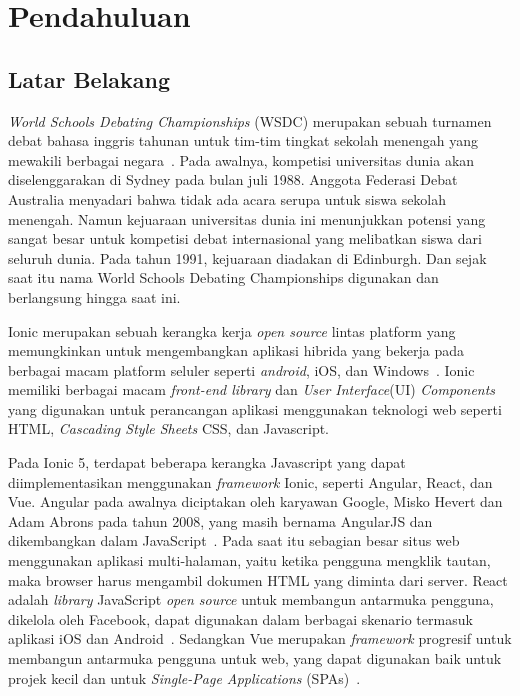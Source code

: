 \chapter{Pendahuluan}
\label{chap:intro}
   
\section{Latar Belakang}
\label{sec:label}

\textit{World Schools Debating Championships} (WSDC) merupakan sebuah turnamen debat bahasa inggris tahunan untuk tim-tim tingkat sekolah menengah yang mewakili berbagai negara~\cite{wsdc}. Pada awalnya, kompetisi universitas dunia akan diselenggarakan di Sydney pada bulan juli 1988. Anggota Federasi Debat Australia menyadari bahwa tidak ada acara serupa untuk siswa sekolah menengah. Namun kejuaraan universitas dunia ini menunjukkan potensi yang sangat besar untuk kompetisi debat internasional yang melibatkan siswa dari seluruh dunia. Pada tahun 1991, kejuaraan diadakan di Edinburgh. Dan sejak saat itu nama World Schools Debating Championships digunakan dan berlangsung hingga saat ini. 

Ionic merupakan sebuah kerangka kerja {\it open source} lintas platform yang memungkinkan untuk mengembangkan aplikasi hibrida yang bekerja pada berbagai macam platform seluler seperti {\it android}, iOS, dan Windows~\cite{waranashiwar:18:ionic}. Ionic memiliki berbagai macam \textit{front-end library} dan \textit{User Interface}(UI) {\it Components} yang digunakan untuk  perancangan aplikasi menggunakan teknologi web seperti HTML, {\it Cascading Style Sheets} CSS, dan Javascript. 

Pada Ionic 5, terdapat beberapa kerangka Javascript yang dapat diimplementasikan menggunakan \textit{framework} Ionic, seperti Angular, React, dan Vue. Angular pada awalnya diciptakan oleh karyawan Google, Misko Hevert dan Adam Abrons pada tahun 2008, yang masih bernama AngularJS dan dikembangkan dalam JavaScript~\cite{wohlgethan:18:supporting}. Pada saat itu sebagian besar situs web menggunakan aplikasi multi-halaman, yaitu ketika pengguna mengklik tautan, maka browser harus mengambil dokumen HTML yang diminta dari server. React adalah \textit{library} JavaScript {\it open source} untuk membangun antarmuka pengguna, dikelola oleh Facebook, dapat digunakan dalam berbagai skenario termasuk aplikasi iOS dan Android~\cite{wohlgethan:18:supporting}. Sedangkan Vue merupakan \textit{framework}  progresif untuk membangun antarmuka pengguna untuk web, yang dapat digunakan baik untuk projek kecil dan untuk {\it Single-Page Applications} (SPAs)~\cite{wohlgethan:18:supporting}.

